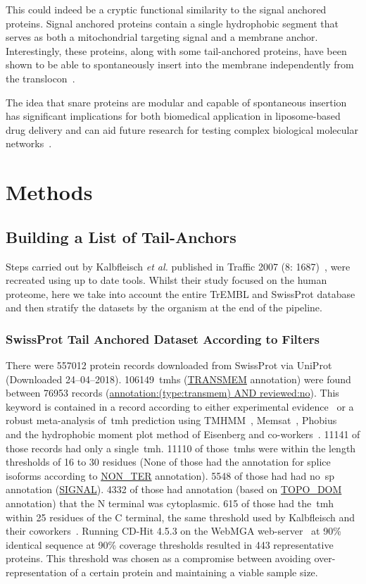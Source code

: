 This could indeed be a cryptic functional similarity to the signal anchored proteins.
Signal anchored proteins contain a single hydrophobic segment that serves as both a mitochondrial targeting signal and a membrane anchor.
Interestingly, these proteins, along with some tail-anchored proteins, have been shown to be able to spontaneously insert into the membrane independently from the translocon~\cite{Elisa2012, Lan2000, Colombo2009}.

The idea that \gls{snare} proteins are modular and capable of spontaneous insertion has significant implications for both biomedical application in liposome-based drug delivery and can aid future research for testing complex biological molecular networks~\cite{Allen2013, Nordlund2014}.

\section{Methods}

\subsection{Building a List of Tail-Anchors}
Steps carried out by Kalbfleisch \textit{et al.} published in Traffic 2007 (8: 1687)~\cite{Kalbfleisch2007}, were recreated using up to date tools.
Whilst their study focused on the human proteome, here we take into account the entire TrEMBL and SwissProt database and then stratify the datasets by the organism at the end of the pipeline.

\subsubsection{SwissProt Tail Anchored Dataset According to Filters}
There were 557012 protein records downloaded from SwissProt via UniProt~\cite{TheUniProtConsortium2014} (Downloaded 24--04--2018).
106149~\gls{tmh}s (\url{TRANSMEM} annotation) were found between 76953 records (\url{annotation:(type:transmem) AND reviewed:no}).
This keyword is contained in a record according to either experimental evidence~\cite{TheUniProtConsortium2014} or a robust meta-analysis of~\gls{tmh} prediction using TMHMM~\cite{Krogh2001}, Memsat~\cite{Jones2007}, Phobius~\cite{Kall2004,Kall2007} and the hydrophobic moment plot method of Eisenberg and co-workers~\cite{Eisenberg1984}.
11141 of those records had only a single~\gls{tmh}.
11110 of those~\gls{tmh}s were within the length thresholds of 16 to 30 residues (None of those had the annotation for splice isoforms according to \url{NON_TER} annotation).
5548 of those had had no~\gls{sp} annotation (\url{SIGNAL}).
4332 of those had annotation (based on \url{TOPO_DOM} annotation) that the N terminal was cytoplasmic.
615 of those had the~\gls{tmh} within 25 residues of the C terminal, the same threshold used by Kalbfleisch and their coworkers~\cite{Kalbfleisch2007}.
Running CD-Hit 4.5.3 on the WebMGA web-server~\cite{Huang2010, Wu2011} at 90\% identical sequence at 90\% coverage thresholds resulted in 443 representative proteins.
This threshold was chosen as a compromise between avoiding over-representation of a certain protein and maintaining a viable sample size.

